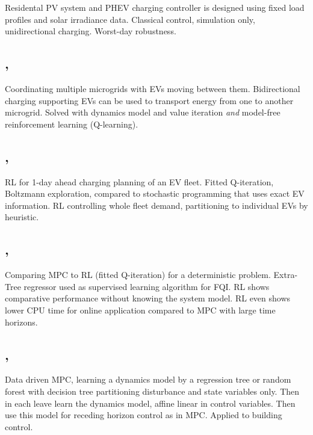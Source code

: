 \documentclass[a4paper]{article}
\begin{document}
\begin{multicols}{2}
	Residental PV system and PHEV charging controller is designed
	using fixed load profiles and solar irradiance data. Classical 
	control, simulation only, unidirectional charging. Worst-day
	robustness.
	
	\subsection{, \cite{8335743}}
	
	Coordinating multiple microgrids with EVs moving between them.
	Bidirectional charging supporting EVs can be used to transport energy
	from one to another microgrid.
	Solved with dynamics model and value iteration \emph{and} model-free
	reinforcement learning (Q-learning).
	
	\subsection{, \cite{7056534}}
	
	RL for 1-day ahead charging planning of an EV fleet. Fitted Q-iteration,
	Boltzmann exploration, 
	compared to stochastic programming that uses exact EV information.
	RL controlling whole fleet demand, partitioning to individual EVs
	by heuristic.	
	
	\subsection{, \cite{4717266}}
	
	Comparing MPC to RL (fitted Q-iteration) for a deterministic problem.
	Extra-Tree regressor used as supervised learning algorithm for FQI.
	RL shows comparative performance without knowing the system model.
	RL even shows lower CPU time for online application compared
	to MPC with large time horizons.
	
	\subsection{, \cite{SMARRA20181252}}
	
	Data driven MPC, learning a dynamics model by a regression tree or
	random forest with decision tree partitioning disturbance and state variables
	only. Then in each leave learn the dynamics model, affine linear in control
	variables. Then use this model for receding horizon control as in MPC. 
	Applied to building control.
	
	\printbibliography
	
\end{multicols}
\end{document}
